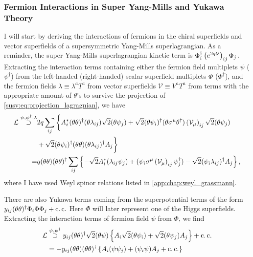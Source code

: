\documentclass[../main.tex]{subfiles}
\begin{document}
\subsubsection*{Fermion Interactions in Super Yang-Mills and Yukawa Theory}
I will start by deriving the interactions of fermions in the chiral superfields and vector superfields of a supersymmetric Yang-Mills superlagrangian.
As a reminder, the super Yang-Mills superlagrangian kinetic term is \(\Phi^\dagger_i \left(e^{2q \mathcal{V}}\right)_{ij}\Phi_j\).
Extracting the interaction terms containing either the fermion field multiplets \(\psi\) (\(\psi^\dagger\)) from the left-handed (right-handed) scalar superfield multiplets \(\Phi\) (\(\Phi^\dagger\)),
and the fermion fields \(\lambda \equiv \lambda^a T^a\) from vector superfields \(\mathcal{V} \equiv V^a T^a\) from terms with the appropriate amount of \(\theta\)'s to survive the projection of \cref{susy:eq:projection_lagragnian}, we have
\begin{align}
  \label{susy:eq:psi_kin_int}
  \nonumber
  \L \stackrel{\psi, \psi^\dagger, \lambda}{\supset} & 2q \sum_{ij} \bigg\{ A^\ast_i (\theta\theta)^\dagger (\theta\lambda_{ij}) \sqrt{2} (\theta\psi_j) + \sqrt{2} (\theta\psi_i)^\dagger (\theta\sigma\^\mu\theta^\dagger) \pclosed{\mathcal{V}_\mu}_{ij} \sqrt{2} (\theta\psi_j) \\
  \nonumber
                                                     & + \sqrt{2} (\theta\psi_i)^\dagger (\theta\theta) (\theta\lambda_{ij})^\dagger A_j \bigg\}                                                                                                                                    \\
  =                                                  & q(\theta\theta)(\theta\theta)^\dagger \sum_{ij} \cclosed{ -\sqrt{2} A^\ast_i (\lambda_{ij}\psi_j) + (\psi_i \sigma\^\mu \pclosed{\mathcal{V}_\mu}_{ij} \psi^\dagger_j) - \sqrt{2} (\psi_i\lambda_{ij})^\dagger A_j },
\end{align}
where I have used Weyl spinor relations listed in \cref{app:chap:weyl_grassmann}.
\medskip

There are also Yukawa terms coming from the superpotential terms of the form \(y_{ij} (\theta\theta)^\dagger \Phi_i \Phi \Phi_j + \operatorname{c.c.}\)
Here \(\Phi\) will later represent one of the Higgs superfields.
Extracting the interaction terms of fermion field \(\psi\) from \(\Phi\), we find
\begin{align}
  \label{susy:eq:psi_yuk_int}
  \nonumber
  \mathcal{L} & \stackrel{\psi, \psi^\dagger}{\supset} y_{ij} (\theta\theta)^\dagger \sqrt{2} (\theta\psi) \left\{ A_i \sqrt{2}(\theta\psi_i) + \sqrt{2}(\theta\psi_j)A_j \right\} + \operatorname{c.c.} \\
     & = -y_{ij} (\theta\theta)(\theta\theta)^\dagger \left\{ A_i(\psi\psi_j) + (\psi_i\psi)A_j + \operatorname{c.c.} \right\}
\end{align}
\end{document}
